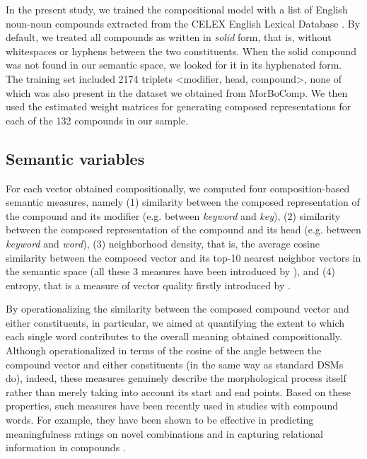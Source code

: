 \documentclass[output=paper]{langsci/langscibook}
\begin{document}
In the present study, we trained the compositional model with a list of English noun-noun compounds extracted from the CELEX English Lexical Database \citep{celex}. By default, we treated all compounds as written in \emph{solid} form, that is, without whitespaces or hyphens between the two constituents. When the solid compound was not found in our semantic space, we looked for it in its hyphenated form. The training set included 2174 triplets <modifier, head, compound>, none of which was also present in the dataset we obtained from MorBoComp. We then used the estimated weight matrices for generating composed representations for each of the 132 compounds in our sample.


\subsection{Semantic variables}

For each vector obtained compositionally, we computed four composition-based semantic measures, namely (1) similarity between the composed representation of the compound and its modifier (e.g. between \emph{keyword} and \emph{key}), (2) similarity between the composed representation of the compound and its head (e.g. between \emph{keyword} and \emph{word}), (3) neighborhood density, that is, the average cosine similarity between the composed vector and its top-10 nearest neighbor vectors in the semantic space (all these 3 measures have been introduced by \citealt{vecchi2011}), and (4) entropy, that is a measure of vector quality firstly introduced by \cite{lazaridoufish}.

By operationalizing the similarity between the composed compound vector and either constituents, in particular, we aimed at quantifying the extent to which each single word contributes to the overall meaning obtained compositionally. Although operationalized in terms of the cosine of the angle between the compound vector and either constituents (in the same way as standard DSMs do), indeed, these measures genuinely describe the morphological process itself rather than merely taking into account its start and end points. Based on these properties, such measures have been recently used in studies with compound words. For example, they have been shown to be effective in predicting meaningfulness ratings on novel combinations \citep{gunther2016} and in capturing relational information in compounds \citep{marelli2017}.

\end{document}
